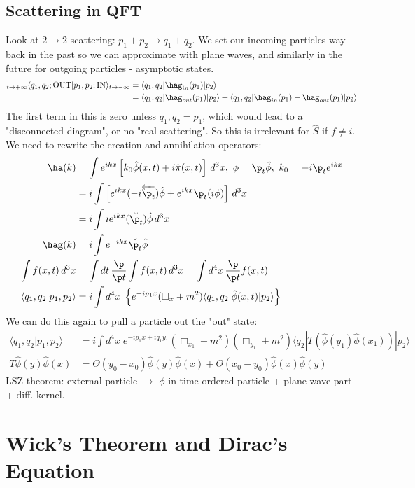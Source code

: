 \documentclass[a4paper, 11pt, normalem]{report}
\newcommand\hphi{\hat{\phi}}
\newcommand\hpi{\hat{\pi}}
\begin{document}
\section{Scattering in QFT}
Look at $2\to2$ scattering: $p_1 + p_2 \to q_1 + q_2$.
We set our incoming particles way back in the past so we can approximate with plane waves, and similarly in the future for outgoing particles - asymptotic states.
\begin{align}
    {}_{t\to +\infty}\langle q_1,q_2;\text{OUT}|p_1,p_2;\text{IN}\rangle_{t\to-\infty} &= \langle q_1,q_2|\hag_{in}(p_1)|p_2\rangle \\
                                                                                       &= \langle q_1,q_2|\hag_{out}(p_1)|p_2\rangle + \langle q_1,q_2|\hag_{in}(p_1)-\hag_{out}(p_1)|p_2\rangle
\end{align}
The first term in this is zero unless $q_1,q_2=p_1$, which would lead to a "disconnected diagram", or no "real scattering".
So this is irrelevant for $\hat{S}$ if $f \neq i$.
We need to rewrite the creation and annihilation operators:
\begin{align}
    \ha(k) &= \int e^{ikx}\left[k_0\hphi(x,t) + i\hpi(x,t)\right]\,d^3x,~ \phi = \p_t\hphi,~ k_0 = -i\p_te^{ikx} \\
           &= i\int \left[e^{ikx}(-i\overleftarrow{\p_t})\hphi+e^{ikx}\p_t(i\phi)\right]\,d^3x \\
           &= i\int ie^{ikx}(\breve{\p_t})\hphi\,d^3x \\
    \hag(k) &= i\int e^{-ikx}\breve{\p_t}\hphi \\
    \int f(x,t)\,d^3x &= \int dt\,\frac{\p}{\p t}\int f(x,t)\,d^3x = \int d^4x\,\frac{\p}{\p t}f(x,t) \\
    \langle q_1,q_2|p_1,p_2\rangle &= i\int d^4x\;\left\{e^{-ip_1x}(\Box_x+m^2)\langle q_1,q_2|\hphi(x,t)|p_2\rangle\right\}
\end{align}
We can do this again to pull a particle out the "out" state:
\begin{align}
    \langle q_1,q_2|p_1,p_2\rangle &= i\int d^4x\; e^{-ip_1x+iq_1y_1}(\Box_{x_1}+m^2)(\Box_{y_1}+m^2)\langle q_2|T(\hphi(y_1)\hphi(x_1))|p_2\rangle \\
    T\hphi(y)\hphi(x) &= \Theta(y_0-x_0)\hphi(y)\hphi(x) + \Theta(x_0-y_0)\hphi(x)\hphi(y)
\end{align}
LSZ-theorem: external particle $\to$ $\phi$ in time-ordered particle + plane wave part + diff. kernel.

\chapter{Wick's Theorem and Dirac's Equation}
\end{document}
